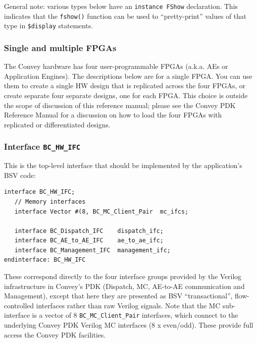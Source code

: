 \documentclass[twoside,letterpaper,11pt]{article}
\begin{document}
General note: various types below have an \verb|instance FShow|
declaration.  This indicates that the \verb|fshow()| function can be
used to ``pretty-print'' values of that type in \verb|$display|
statements.


\subsubsection{Single and multiple FPGAs}

The Convey hardware has four user-programmable FPGAs (a.k.a. AEs or
Application Engines).  The descriptions below are for a single FPGA.
You can use them to create a single HW design that is replicated
across the four FPGAs, or create separate four separate designs, one
for each FPGA.  This choice is outside the scope of discussion of this
reference manual; please see the Convey PDK Reference Manual for a
discussion on how to load the four FPGAs with replicated or
differentiated designs.


\subsubsection{Interface {\tt BC\_HW\_IFC}}

\label{sec_app_ifc}
   
This is the top-level interface that should be implemented by the
application's BSV code:
\begin{Verbatim}[frame=single, label=BC\_HW\_IFC.bsv] 
interface BC_HW_IFC;
   // Memory interfaces
   interface Vector #(8, BC_MC_Client_Pair  mc_ifcs;

   interface BC_Dispatch_IFC    dispatch_ifc;
   interface BC_AE_to_AE_IFC    ae_to_ae_ifc;
   interface BC_Management_IFC  management_ifc;
endinterface: BC_HW_IFC
\end{Verbatim}

These correspond directly to the four interface groups provided by the
Verilog infrastructure in Convey's PDK (Dispatch, MC, AE-to-AE
communication and Management), except that here they are presented as
BSV ``transactional'', flow-controlled interfaces rather than raw
Verilog signals.  Note that the MC sub-interface is a vector of 8
\verb|BC_MC_Client_Pair| interfaces, which connect to the underlying
Convey PDK Verilog MC interfaces (8 x even/odd).  These provide full
access the Convey PDK facilities.
\end{document}
